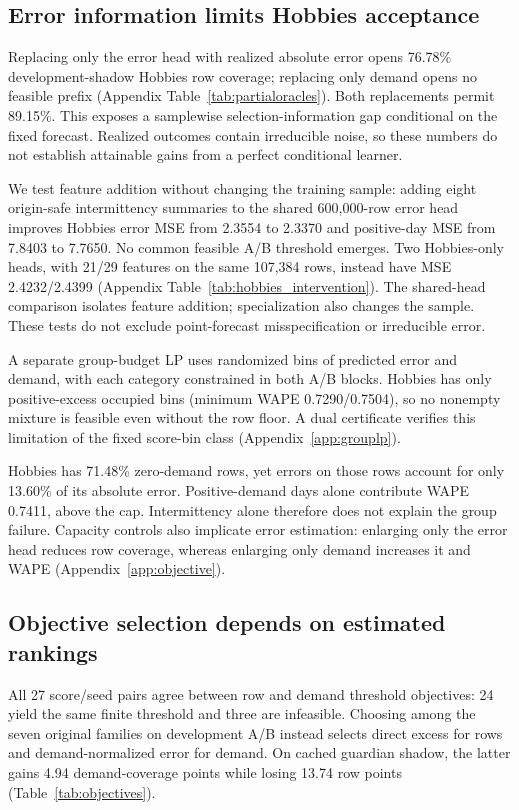 \documentclass{article}
\begin{document}
\subsection{Error information limits Hobbies acceptance}
\label{sec:groups}
Replacing only the error head with realized absolute error opens 76.78\% development-shadow Hobbies row coverage; replacing only demand opens no feasible prefix (Appendix Table~\ref{tab:partialoracles}). Both replacements permit 89.15\%. This exposes a samplewise selection-information gap conditional on the fixed forecast. Realized outcomes contain irreducible noise, so these numbers do not establish attainable gains from a perfect conditional learner.

We test feature addition without changing the training sample: adding eight origin-safe intermittency summaries to the shared 600,000-row error head improves Hobbies error MSE from 2.3554 to 2.3370 and positive-day MSE from 7.8403 to 7.7650. No common feasible A/B threshold emerges. Two Hobbies-only heads, with 21/29 features on the same 107,384 rows, instead have MSE 2.4232/2.4399 (Appendix Table~\ref{tab:hobbies_intervention}). The shared-head comparison isolates feature addition; specialization also changes the sample. These tests do not exclude point-forecast misspecification or irreducible error.

A separate group-budget LP uses randomized bins of predicted error and demand, with each category constrained in both A/B blocks. Hobbies has only positive-excess occupied bins (minimum WAPE 0.7290/0.7504), so no nonempty mixture is feasible even without the row floor. A dual certificate verifies this limitation of the fixed score-bin class (Appendix~\ref{app:grouplp}).

Hobbies has 71.48\% zero-demand rows, yet errors on those rows account for only 13.60\% of its absolute error. Positive-demand days alone contribute WAPE 0.7411, above the cap. Intermittency alone therefore does not explain the group failure. Capacity controls also implicate error estimation: enlarging only the error head reduces row coverage, whereas enlarging only demand increases it and WAPE (Appendix~\ref{app:objective}).

\subsection{Objective selection depends on estimated rankings}
\label{sec:objectives}

All 27 score/seed pairs agree between row and demand threshold objectives: 24 yield the same finite threshold and three are infeasible. Choosing among the seven original families on development A/B instead selects direct excess for rows and demand-normalized error for demand. On cached guardian shadow, the latter gains 4.94 demand-coverage points while losing 13.74 row points (Table~\ref{tab:objectives}).
\end{document}
